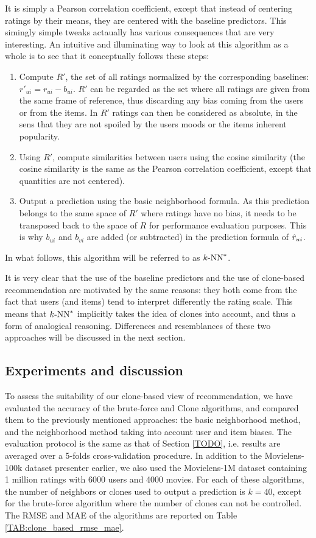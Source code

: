 It is simply a Pearson correlation coefficient, except that instead of
centering ratings by their means, they are centered with the baseline
predictors. This simingly simple tweaks actaually has various consequences that
are very interesting. An intuitive and illuminating way to look at this
algorithm as a whole is to see that it conceptually follows these steps:
\begin{enumerate}
  \item Compute $R'$, the set of all ratings normalized by the corresponding
    baselines: $r'_{ui} = r_{ui} - b_{ui}$.  $R'$ can be regarded as the set
    where all ratings are given from the same frame of reference, thus
    discarding any bias coming from the users or from the items. In $R'$
    ratings can then be considered as absolute, in the sens that they are not
    spoiled by the users moods or the items inherent popularity.
  \item Using $R'$, compute similarities between users using the cosine
    similarity (the cosine similarity is the same as the Pearson correlation
    coefficient, except that quantities are not centered).
  \item Output a prediction using the basic neighborhood formula. As this
    prediction belongs to the same space of $R'$ where ratings have no bias, it
    needs to be transposed back to the space of $R$ for performance evaluation
    purposes. This is why $b_{ui}$ and $b_{vi}$ are added (or subtracted) in
    the prediction formula of $\hat{r}_{ui}$.
\end{enumerate}
\noindent
In what follows, this algorithm will be referred to as $k\text{-NN}^*$.

It is very clear that the use of the baseline predictors and the use of
clone-based recommendation are motivated by the same reasons: they both come
from the fact that users (and items) tend to interpret differently the rating
scale.  This means that $k\text{-NN}^*$ implicitly takes the idea of clones into
account, and thus a form of analogical reasoning.  Differences and resemblances
of these two approaches will be discussed in the next section.

\subsection{Experiments and discussion}
\label{expeDiscuss}

To assess the suitability of our clone-based view of recommendation, we have
evaluated the accuracy of the brute-force and Clone algorithms, and compared
them to the previously mentioned approaches: the basic neighborhood method, and
the neighborhood method taking into account user and item biases. The
evaluation protocol is the same as that of Section \ref{TODO}, i.e. results are
averaged over a 5-folds cross-validation procedure. In addition to
the Movielens-100k dataset presenter earlier, we also used the Movielens-1M
dataset containing 1 million ratings with 6000 users and 4000 movies.
For each of these algorithms, the number of neighbors or clones used to output
a prediction is $k = 40$, except for the brute-force algorithm where the number
of clones can not be controlled. The RMSE and MAE of the algorithms are
reported on Table
\ref{TAB:clone_based_rmse_mae}.


